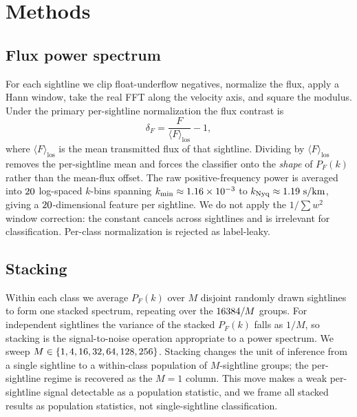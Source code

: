 \section{Methods}
\label{sec:methods}

\subsection{Flux power spectrum}
\label{sec:methods:pk}

For each sightline we clip float-underflow negatives, normalize the flux, apply a
Hann window, take the real FFT along the velocity axis, and square the modulus.
Under the primary per-sightline normalization the flux contrast is
\begin{equation}
  \delta_F = \frac{F}{\langle F\rangle_\mathrm{los}} - 1,
  \label{eq:deltaf}
\end{equation}
where $\langle F\rangle_\mathrm{los}$ is the mean transmitted flux of that
sightline. Dividing by $\langle F\rangle_\mathrm{los}$ removes the per-sightline
mean and forces the classifier onto the \emph{shape} of $P_F(k)$ rather than the
mean-flux offset. The raw positive-frequency power is averaged into
$20$ log-spaced $k$-bins spanning $k_\mathrm{min}\approx1.16\times10^{-3}$ to
$k_\mathrm{Nyq}\approx1.19~\mathrm{s/km}$, giving a $20$-dimensional feature
per sightline. We do not apply the $1/\sum w^2$ window correction: the constant
cancels across sightlines and is irrelevant for classification. Per-class
normalization is rejected as label-leaky.

\subsection{Stacking}
\label{sec:methods:stack}

Within each class we average $P_F(k)$ over $M$ disjoint randomly drawn sightlines
to form one stacked spectrum, repeating over the $16384/M$ groups. For
independent sightlines the variance of the stacked $P_F(k)$ falls as $1/M$, so
stacking is the signal-to-noise operation appropriate to a power spectrum. We
sweep $M\in\{1,4,16,32,64,128,256\}$. Stacking changes the unit of inference from a single
sightline to a within-class population of $M$-sightline groups; the per-sightline
regime is recovered as the $M=1$ column. This move makes a weak per-sightline
signal detectable as a population statistic, and we frame all stacked results as
population statistics, not single-sightline classification.

